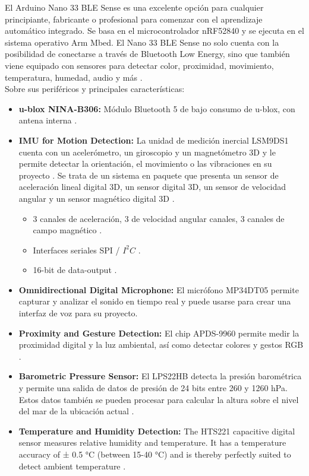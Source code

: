 El Arduino Nano 33 BLE Sense es una excelente opción para cualquier principiante, fabricante o profesional para comenzar con el aprendizaje automático integrado. Se basa en el microcontrolador nRF52840 y se ejecuta en el sistema operativo Arm Mbed. El Nano 33 BLE Sense no solo cuenta con la posibilidad de conectarse a través de Bluetooth Low Energy, sino que también viene equipado con sensores para detectar color, proximidad, movimiento, temperatura, humedad, audio y más \cite{placa}.\\
Sobre sus periféricos y principales características:
\begin{itemize}
    \item \textbf{u-blox NINA-B306:} Módulo Bluetooth 5 de bajo consumo de u-blox, con antena interna \cite{placa}.
    \item \textbf{IMU for Motion Detection:} La unidad de medición inercial LSM9DS1 cuenta con un acelerómetro, un giroscopio y un magnetómetro 3D y le permite detectar la orientación, el movimiento o las vibraciones en su proyecto \cite{placa}. Se trata de un sistema en paquete que presenta un sensor de aceleración lineal digital 3D, un sensor digital 3D, un sensor de velocidad angular y un sensor magnético digital 3D \cite{acele}.
    
    
    \begin{itemize}
        \item  3 canales de aceleración, 3 de velocidad angular canales, 3 canales de campo magnético \cite{acele}.
        \item Interfaces seriales SPI / $I^2C$ \cite{acele}.
        \item 16-bit de data-output \cite{acele}.
    \end{itemize}
    \item \textbf{Omnidirectional Digital Microphone:} El micrófono MP34DT05 permite capturar y analizar el sonido en tiempo real y puede usarse para crear una interfaz de voz para su proyecto\cite{placa}.
    \item \textbf{Proximity and Gesture Detection:} El chip APDS-9960 permite medir la proximidad digital y la luz ambiental, así como detectar colores y gestos RGB \cite{placa}.
    \item \textbf{Barometric Pressure Sensor:} El LPS22HB detecta la presión barométrica y permite una salida de datos de presión de 24 bits entre 260 y 1260 hPa. Estos datos también se pueden procesar para calcular la altura sobre el nivel del mar de la ubicación actual \cite{placa}.
    \item \textbf{Temperature and Humidity Detection: }The HTS221 capacitive digital sensor measures relative humidity and temperature. It has a temperature accuracy of ± 0.5 °C (between 15-40 °C) and is thereby perfectly suited to detect ambient temperature \cite{placa}.






\end{itemize}




